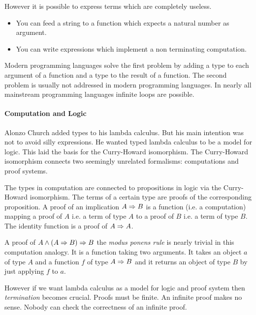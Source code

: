 However it is possible to express terms which are completely useless.

\begin{itemize}

\item You can feed a string to a function which expects a natural number as
argument.

\item You can write expressions which implement a non terminating computation.

\end{itemize}

Modern programming languages solve the first problem by adding a type to each
argument of a function and a type to the result of a function. The second
problem is usually not addressed in modern programming languages. In nearly all
mainstream programming languages infinite loops are possible.





\paragraph{Computation and Logic}
Alonzo Church added types to his lambda calculus. But his main intention was not
to avoid silly expressions. He wanted typed lambda calculus to be a model for
logic. This laid the basis for the Curry-Howard isomorphism. The Curry-Howard
isomorphism connects two seemingly unrelated formalisms: computations and proof
systems.

The types in computation are connected to propositions in logic via the
Curry-Howard isomorphism. The terms of a certain type are proofs of the
corresponding proposition. A proof of an implication $A \Rightarrow B$ is a function
(i.e. a computation) mapping a proof of $A$ i.e. a term of type $A$ to a
proof of $B$ i.e. a term of type $B$. The identity function is a proof of $A
\Rightarrow A$.

A proof of $A \land (A \Rightarrow B) \Rightarrow B$ the \emph{modus ponens rule} is nearly
trivial in this computation analogy. It is a function taking two arguments. It
takes an object $a$ of type $A$ and a function $f$ of type $A \Rightarrow B$ and it
returns an object of type $B$ by just applying $f$ to $a$.

However if we want lambda calculus as a model for logic and proof system then
\emph{termination} becomes crucial. Proofs must be finite. An infinite proof
makes no sense. Nobody can check the correctness of an infinite proof.


